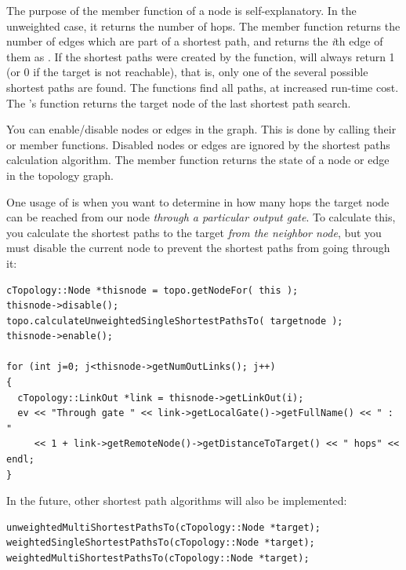 The purpose of the  member function of a
node is self-explanatory. In the unweighted case, it returns the
number of hops. The  member function returns the number
of edges which are part of a shortest path, and
 returns the \textit{i}th edge of them as
. If the shortest paths were created by the
 function,
 will always return 1 (or 0 if the target is not
reachable), that is, only one of the several possible shortest paths
are found.  The
 functions
find all paths, at increased run-time cost. The 's
 function returns the target node of the last
shortest path search.

You can enable/disable nodes or edges in the graph. This is done by
calling their  or  member functions.
Disabled nodes or edges are ignored by the shortest paths calculation
algorithm. The  member function returns the state of
a node or edge in the topology graph.

One usage of  is when you want to determine in how many
hops the target node can be reached from our node \textit{through
a particular output gate}. To calculate this, you calculate the
shortest paths to the target \textit{from the neighbor node}, but
you must disable the current node to prevent the shortest paths
from going through it:

\begin{verbatim}
cTopology::Node *thisnode = topo.getNodeFor( this );
thisnode->disable();
topo.calculateUnweightedSingleShortestPathsTo( targetnode );
thisnode->enable();

for (int j=0; j<thisnode->getNumOutLinks(); j++)
{
  cTopology::LinkOut *link = thisnode->getLinkOut(i);
  ev << "Through gate " << link->getLocalGate()->getFullName() << " : "
     << 1 + link->getRemoteNode()->getDistanceToTarget() << " hops" << endl;
}
\end{verbatim}

In the future, other shortest path algorithms will also be implemented:

\begin{verbatim}
unweightedMultiShortestPathsTo(cTopology::Node *target);
weightedSingleShortestPathsTo(cTopology::Node *target);
weightedMultiShortestPathsTo(cTopology::Node *target);
\end{verbatim}






